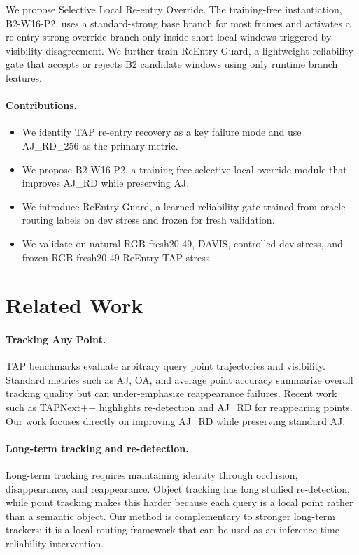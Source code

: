 \documentclass[10pt,twocolumn]{article}
\begin{document}
We propose Selective Local Re-entry Override. The training-free instantiation, B2-W16-P2, uses a standard-strong base branch for most frames and activates a re-entry-strong override branch only inside short local windows triggered by visibility disagreement. We further train ReEntry-Guard, a lightweight reliability gate that accepts or rejects B2 candidate windows using only runtime branch features.

\paragraph{Contributions.}
\begin{itemize}
    \item We identify TAP re-entry recovery as a key failure mode and use AJ\_RD\_256 as the primary metric.
    \item We propose B2-W16-P2, a training-free selective local override module that improves AJ\_RD while preserving AJ.
    \item We introduce ReEntry-Guard, a learned reliability gate trained from oracle routing labels on dev stress and frozen for fresh validation.
    \item We validate on natural RGB fresh20-49, DAVIS, controlled dev stress, and frozen RGB fresh20-49 ReEntry-TAP stress.
\end{itemize}

\section{Related Work}

\paragraph{Tracking Any Point.}
TAP benchmarks evaluate arbitrary query point trajectories and visibility. Standard metrics such as AJ, OA, and average point accuracy summarize overall tracking quality but can under-emphasize reappearance failures. Recent work such as TAPNext++ highlights re-detection and AJ\_RD for reappearing points. Our work focuses directly on improving AJ\_RD while preserving standard AJ.

\paragraph{Long-term tracking and re-detection.}
Long-term tracking requires maintaining identity through occlusion, disappearance, and reappearance. Object tracking has long studied re-detection, while point tracking makes this harder because each query is a local point rather than a semantic object. Our method is complementary to stronger long-term trackers: it is a local routing framework that can be used as an inference-time reliability intervention.
\end{document}
